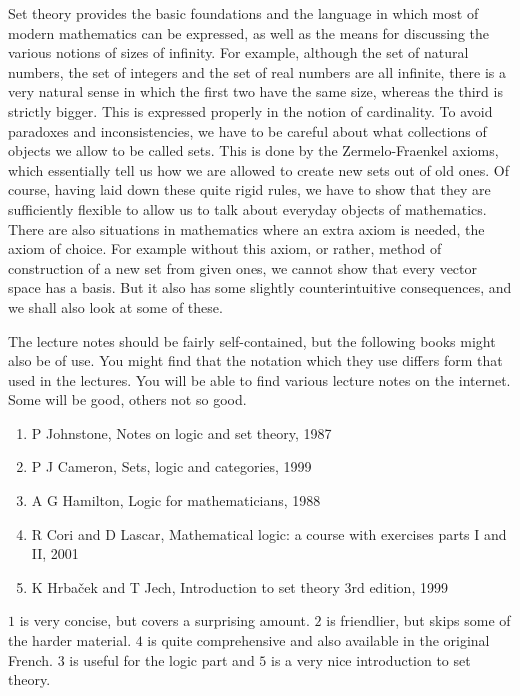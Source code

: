 Set theory provides the basic foundations and the language in which most of modern mathematics can be expressed, as well as the means for discussing the various notions of sizes of infinity. For example, although the set of natural numbers, the set of integers and the set of real numbers are all infinite, there is a very natural sense in which the first two have the same size, whereas the third is strictly bigger. This is expressed properly in the notion of cardinality. To avoid paradoxes and inconsistencies, we have to be careful about what collections of objects we allow to be called sets. This is done by the Zermelo-Fraenkel axioms, which essentially tell us how we are allowed to create new sets out of old ones. Of course, having laid down these quite rigid rules, we have to show that they are sufficiently flexible to allow us to talk about everyday objects of mathematics. There are also situations in mathematics where an extra axiom is needed, the axiom of choice. For example without this axiom, or rather, method of construction of a new set from given ones, we cannot show that every vector space has a basis. But it also has some slightly counterintuitive consequences, and we shall also look at some of these.

The lecture notes should be fairly self-contained, but the following books might also be of use. You might find that the notation which they use differs form that used in the lectures. You will be able to find various lecture notes on the internet. Some will be good, others not so good.

\begin{enumerate}
\item P Johnstone, Notes on logic and set theory, 1987
\item P J Cameron, Sets, logic and categories, 1999
\item A G Hamilton, Logic for mathematicians, 1988
\item R Cori and D Lascar, Mathematical logic: a course with exercises parts I and II, 2001
\item K Hrbaček and T Jech, Introduction to set theory 3rd edition, 1999
\end{enumerate}

$ 1 $ is very concise, but covers a surprising amount. $ 2 $ is friendlier, but skips some of the harder material. $ 4 $ is quite comprehensive and also available in the original French. $ 3 $ is useful for the logic part and $ 5 $ is a very nice introduction to set theory.

\pagebreak

